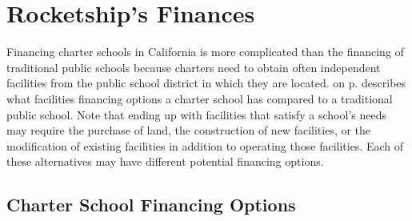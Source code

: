 \section{Rocketship's Finances}\indent%
\label{sec:rocketship_finances}

Financing charter schools in California is more complicated than the financing of traditional public schools because charters need to obtain often independent facilities from the public school district in which they are located.
 on p.\pageref{tab:charter-school-financing-options} describes what facilities financing options a charter school has compared to a traditional public school. Note that ending up with facilities that satisfy a school's needs may require the purchase of land, the construction of new facilities, or the modification of existing facilities in addition to operating those facilities. Each of these alternatives may have different potential financing options.

\subsection{Charter School Financing Options}\indent%
\label{sec:charter-school-financing-options}

